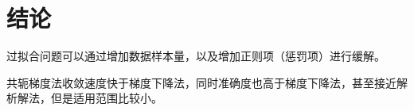 \section{结论}

过拟合问题可以通过增加数据样本量，以及增加正则项（惩罚项）进行缓解。

共轭梯度法收敛速度快于梯度下降法，同时准确度也高于梯度下降法，甚至接近解析解法，但是适用范围比较小。
